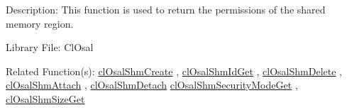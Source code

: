 \begin{Desc}
\item[Description:]This function is used to return the permissions of the shared memory region.\end{Desc}
\begin{Desc}
\item[Library File:]Cl\-Osal\end{Desc}
\begin{Desc}
\item[Related Function(s):]\hyperlink{pageosal145}{cl\-Osal\-Shm\-Create} , \hyperlink{pageosal146}{cl\-Osal\-Shm\-Id\-Get} , 
\hyperlink{pageosal147}{cl\-Osal\-Shm\-Delete} , \hyperlink{pageosal148}{cl\-Osal\-Shm\-Attach} , 
\hyperlink{pageosal149}{cl\-Osal\-Shm\-Detach} \hyperlink{pageosal151}{cl\-Osal\-Shm\-Security\-Mode\-Get} , 
\hyperlink{pageosal152}{cl\-Osal\-Shm\-Size\-Get}\end{Desc}

\newpage


